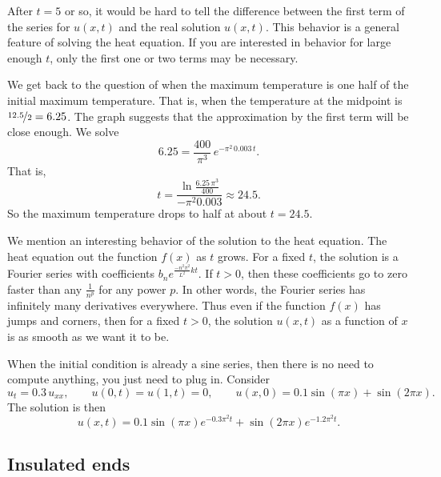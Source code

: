 \begin{example}
After $t=5$ or so,
it would be hard to tell the difference
between the first term of the series for $u(x,t)$ and 
the real solution $u(x,t)$.  This behavior
is a general feature of solving the heat equation.
If you are interested in behavior for large enough $t$, only the
first one or two terms may be necessary.

We get back to the question of when the maximum temperature is one half of the
initial maximum temperature.  That is, when the temperature
at the midpoint is $\nicefrac{12.5}{2} = 6.25$.  The graph suggests
that the approximation by the first term will be close enough.  We
solve
\begin{equation*}
6.25 =
\frac{400}{\pi^3}
\, e^{-\pi^2 \, 0.003 \, t} .
\end{equation*}
That is,
\begin{equation*}
t =
\frac{\ln \frac{6.25\,\pi^3}{400}}{-\pi^2 0.003}
\approx 24.5 .
\end{equation*}
So the maximum temperature drops to half at about $t=24.5$.
\end{example}

We mention an interesting behavior of the solution to the heat equation.
The heat equation
 out the function $f(x)$ as $t$ grows.  For a fixed $t$,
the solution is a Fourier series with coefficients
$b_n e^{\frac{-n^2 \pi^2}{L^2} k t}$.  If $t > 0$, then these coefficients
go to zero faster than any $\frac{1}{n^p}$ for any power $p$.  In other
words, the Fourier series has infinitely many derivatives everywhere.
Thus even if the function $f(x)$ has jumps and corners, then for
a fixed $t > 0$, the solution
$u(x,t)$ as a function of $x$ is as smooth as we want it
to be.

\begin{example}
When the initial condition is already a sine series, then there is no need
to compute anything, you just need to plug in.  Consider
\begin{equation*}
u_t = 0.3 \, u_{xx}, \qquad u(0,t)=u(1,t)=0, \qquad u(x,0) = 0.1 \sin(\pi x) +
\sin(2\pi x) .
\end{equation*}
The solution is then
\begin{equation*}
u(x,t) =
0.1 \sin(\pi x) e^{- 0.3 \pi^2 t}
+ 
\sin(2 \pi x) e^{- 1.2 \pi^2 t} .
\end{equation*}
\end{example}

\subsection{Insulated ends}

